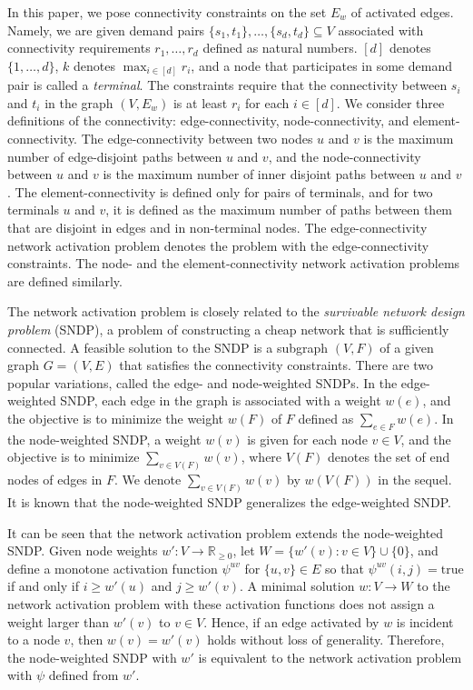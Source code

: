 \documentclass[11pt]{article}
\newcommand{\Rset}{\mathbb{R}}
\newcommand{\true}{\mbox{true}}
\begin{document}
In this paper, we pose connectivity constraints 
on the set $E_w$ of activated edges.
Namely, we are given
demand pairs $\{s_1,t_1\},\ldots,\{s_d,t_d\}\subseteq V$ associated with
connectivity requirements $r_1,\ldots,r_d$ defined as natural numbers.
$[d]$ denotes $\{1,\ldots,d\}$, $k$ denotes $\max_{i \in [d]}r_i$,
and a node that participates in some demand pair is called a {\em terminal}.
The constraints require that
the connectivity between $s_i$ and $t_i$ in
the graph $(V,E_w)$ is at least $r_i$ for each $i \in [d]$.
We consider three definitions of the connectivity:
edge-connectivity, node-connectivity, and element-connectivity.
The edge-connectivity between two nodes $u$ and $v$ is the maximum
number of edge-disjoint paths between $u$ and $v$,
and the node-connectivity 
between $u$ and $v$ is the maximum
number of inner disjoint paths between $u$ and $v$.
The element-connectivity is defined only for pairs of terminals,
and for two terminals $u$ and $v$, it is defined as the maximum number
of paths between them that are disjoint in edges and in non-terminal nodes.
The edge-connectivity network activation problem denotes the problem with the edge-connectivity
constraints.
The node- and the element-connectivity network activation problems 
are defined similarly.

The network activation problem is closely related to
the \emph{survivable network design problem} (SNDP),
a problem of constructing a cheap network that is sufficiently connected.
A feasible solution to the SNDP is a subgraph $(V,F)$ of a given graph $G=(V,E)$
that satisfies the connectivity constraints.
There are two popular variations, called the edge- and
node-weighted SNDPs.
In the edge-weighted SNDP, each edge in the graph is associated with a
weight $w(e)$, and the objective is to minimize the weight $w(F)$ of $F$ defined as
$\sum_{e \in F}w(e)$.
In the node-weighted SNDP, 
a weight $w(v)$ is given for each node $v \in V$, and the objective is
to minimize $\sum_{v \in V(F)} w(v)$, where $V(F)$ denotes the set of
end nodes of edges in $F$.
We denote $\sum_{v \in V(F)} w(v)$ by $w(V(F))$ in the sequel.
It is known that the node-weighted SNDP generalizes the edge-weighted
SNDP.

It can be seen that the network activation problem extends the node-weighted SNDP.
Given node weights $w'\colon V\rightarrow \Rset_{\geq 0}$,
let $W=\{w'(v)\colon v \in V \} \cup \{0\}$,
and define a monotone activation function $\psi^{uv}$ for $\{u,v\}\in E$ so that
$\psi^{uv}(i,j)=\true$ if and only if $i\geq w'(u)$ and $j \geq w'(v)$.
A minimal solution $w\colon V\rightarrow W$ to the network activation
problem with these activation functions
does not assign a weight larger than $w'(v)$ to $v\in V$.
Hence, if an edge activated by $w$ is incident to a node $v$, 
then $w(v)=w'(v)$ holds without loss of generality.
Therefore, the node-weighted SNDP with $w'$ is equivalent to the network activation problem
with $\psi$ defined from $w'$.
\end{document}

